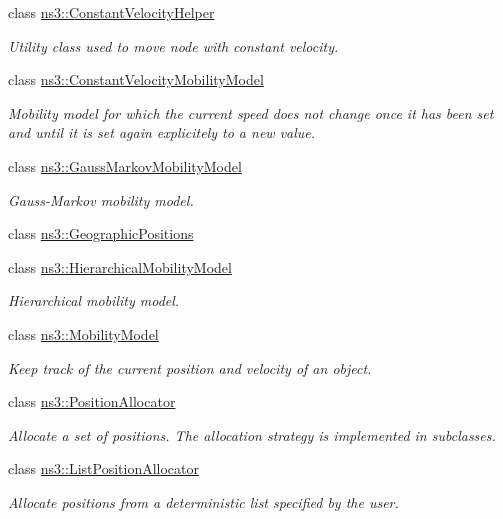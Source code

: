 \begin{DoxyCompactItemize}
class \hyperlink{classns3_1_1ConstantVelocityHelper}{ns3\+::\+Constant\+Velocity\+Helper}
\begin{DoxyCompactList}\small\item\em Utility class used to move node with constant velocity. \end{DoxyCompactList}\item 
class \hyperlink{classns3_1_1ConstantVelocityMobilityModel}{ns3\+::\+Constant\+Velocity\+Mobility\+Model}
\begin{DoxyCompactList}\small\item\em Mobility model for which the current speed does not change once it has been set and until it is set again explicitely to a new value. \end{DoxyCompactList}\item 
class \hyperlink{classns3_1_1GaussMarkovMobilityModel}{ns3\+::\+Gauss\+Markov\+Mobility\+Model}
\begin{DoxyCompactList}\small\item\em Gauss-\/\+Markov mobility model. \end{DoxyCompactList}\item 
class \hyperlink{classns3_1_1GeographicPositions}{ns3\+::\+Geographic\+Positions}
\item 
class \hyperlink{classns3_1_1HierarchicalMobilityModel}{ns3\+::\+Hierarchical\+Mobility\+Model}
\begin{DoxyCompactList}\small\item\em Hierarchical mobility model. \end{DoxyCompactList}\item 
class \hyperlink{classns3_1_1MobilityModel}{ns3\+::\+Mobility\+Model}
\begin{DoxyCompactList}\small\item\em Keep track of the current position and velocity of an object. \end{DoxyCompactList}\item 
class \hyperlink{classns3_1_1PositionAllocator}{ns3\+::\+Position\+Allocator}
\begin{DoxyCompactList}\small\item\em Allocate a set of positions. The allocation strategy is implemented in subclasses. \end{DoxyCompactList}\item 
class \hyperlink{classns3_1_1ListPositionAllocator}{ns3\+::\+List\+Position\+Allocator}
\begin{DoxyCompactList}\small\item\em Allocate positions from a deterministic list specified by the user. \end{DoxyCompactList}\item 

\end{DoxyCompactItemize}
